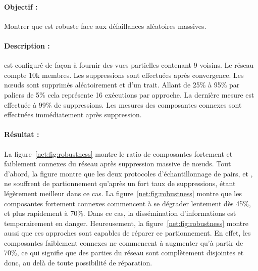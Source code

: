 \paragraph{Objectif :} Montrer que \SPRAY est robuste face aux défaillances
aléatoires massives.

\paragraph{Description :} \CYCLON est configuré de façon à fournir des vues
partielles contenant 9 voisins. Le réseau compte 10k membres. Les suppressions
sont effectuées après convergence. Les nœuds sont supprimés aléatoirement et
d'un trait. Allant de 25\% à 95\% par paliers de 5\% cela représente 16
exécutions par approche. La dernière mesure est effectuée à 99\% de
suppressions. Les mesures des composantes connexes sont effectuées immédiatement
après suppression.

\paragraph{Résultat :} La figure~\ref{net:fig:robustness} montre le ratio de
composantes fortement et faiblement connexes du réseau après suppression massive
de nœuds. Tout d'abord, la figure montre que les deux protocoles
d'échantillonnage de pairs, \SPRAY et \CYCLON, ne souffrent de partionnement
qu'après un fort taux de suppressions, \CYCLON étant légèrement meilleur dans ce
cas. La figure~\ref{net:fig:robustness} montre que les composantes fortement
connexes commencent à se dégrader lentement dès 45\%, et plus rapidement à
70\%. Dans ce cas, la dissémination d'informations est temporairement en
danger. Heureusement, la figure~\ref{net:fig:robustness} montre aussi que ces
approches sont capables de réparer ce partionnement. En effet, les composantes
faiblement connexes ne commencent à augmenter qu'à partir de 70\%, ce qui
signifie que des parties du réseau sont complètement disjointes et donc, au delà
de toute possibilité de réparation.


